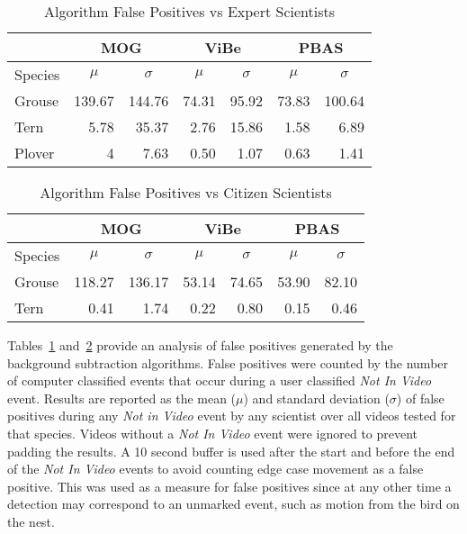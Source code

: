 \begin{table}
\centering
\caption{Algorithm False Positives vs Expert Scientists}
\label{table:algorithm_false_positives_experts}
\begin{tabular}{lrrrrrr}
    \toprule
    \multicolumn{1}{c}{} &
    \multicolumn{2}{c}{MOG} &
    \multicolumn{2}{c}{ViBe} &
    \multicolumn{2}{c}{PBAS}\\
    \midrule
    \multicolumn{1}{c}{Species} &
    \multicolumn{1}{c}{$\mu$} &
    \multicolumn{1}{c}{$\sigma$} &
    \multicolumn{1}{c}{$\mu$} &
    \multicolumn{1}{c}{$\sigma$} &
    \multicolumn{1}{c}{$\mu$} &
    \multicolumn{1}{c}{$\sigma$}\\
    \midrule
    Grouse & 139.67 & 144.76 & 74.31 & 95.92 & 73.83 & 100.64\\
    Tern & 5.78 & 35.37 & 2.76 & 15.86 & 1.58 & 6.89\\
    Plover & 4 & 7.63 & 0.50 & 1.07 & 0.63 & 1.41\\
    \bottomrule
    \end{tabular}
\end{table}

\begin{table}
\centering
\caption{Algorithm False Positives vs Citizen Scientists}
\label{table:algorithm_false_positives_users}
\begin{tabular}{lrrrrrr}
    \toprule
    \multicolumn{1}{c}{} &
    \multicolumn{2}{c}{MOG} &
    \multicolumn{2}{c}{ViBe} &
    \multicolumn{2}{c}{PBAS}\\
    \midrule
    \multicolumn{1}{c}{Species} &
    \multicolumn{1}{c}{$\mu$} &
    \multicolumn{1}{c}{$\sigma$} &
    \multicolumn{1}{c}{$\mu$} &
    \multicolumn{1}{c}{$\sigma$} &
    \multicolumn{1}{c}{$\mu$} &
    \multicolumn{1}{c}{$\sigma$}\\
    \midrule
    Grouse & 118.27 & 136.17 & 53.14 & 74.65 & 53.90 & 82.10\\
    Tern & 0.41 & 1.74 & 0.22 & 0.80 & 0.15 & 0.46\\
    \bottomrule
\end{tabular}
\end{table}

Tables~\ref{table:algorithm_false_positives_experts} and~\ref{table:algorithm_false_positives_users} provide an analysis of false positives generated by the background subtraction algorithms. False positives were counted by the number of computer classified events that occur during a user classified \emph{Not In Video} event. Results are reported as the mean ($\mu$) and standard deviation ($\sigma$) of false positives during any \emph{Not in Video} event by any scientist over all videos tested for that species. Videos without a \emph{Not In Video} event were ignored to prevent padding the results. A 10 second buffer is used after the start and before the end of the \emph{Not In Video} events to avoid counting edge case movement as a false positive. This was used as a measure for false positives since at any other time a detection may correspond to an unmarked event, such as motion from the bird on the nest.


